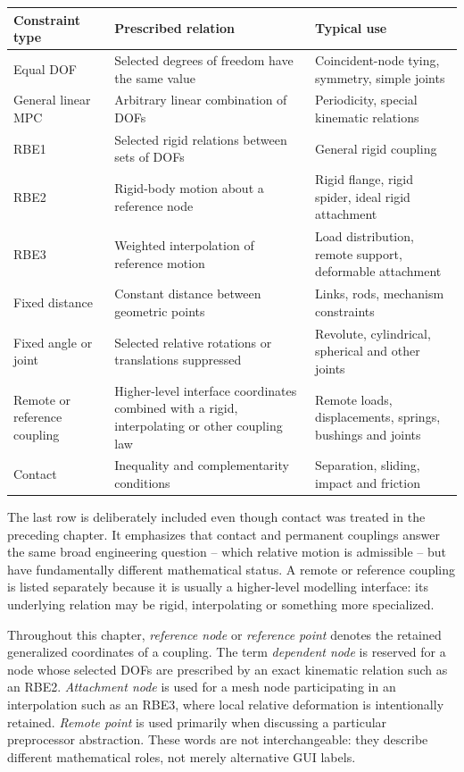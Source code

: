 \begin{center}
\begin{tabular}{|p{}|p{}|p{}|}
\hline
\textbf{Constraint type} & \textbf{Prescribed relation} & \textbf{Typical use} \\
\hline
Equal DOF & Selected degrees of freedom have the same value & Coincident-node tying, symmetry, simple joints \\
\hline
General linear MPC & Arbitrary linear combination of DOFs & Periodicity, special kinematic relations \\
\hline
RBE1 & Selected rigid relations between sets of DOFs & General rigid coupling \\
\hline
RBE2 & Rigid-body motion about a reference node & Rigid flange, rigid spider, ideal rigid attachment \\
\hline
RBE3 & Weighted interpolation of reference motion & Load distribution, remote support, deformable attachment \\
\hline
Fixed distance & Constant distance between geometric points & Links, rods, mechanism constraints \\
\hline
Fixed angle or joint & Selected relative rotations or translations suppressed & Revolute, cylindrical, spherical and other joints \\
\hline
Remote or reference coupling & Higher-level interface coordinates combined with a rigid, interpolating or other coupling law & Remote loads, displacements, springs, bushings and joints \\
\hline
Contact & Inequality and complementarity conditions & Separation, sliding, impact and friction \\
\hline
\end{tabular}
\end{center}

The last row is deliberately included even though contact was treated in the
preceding chapter. It emphasizes that contact and permanent couplings answer the
same broad engineering question -- which relative motion is admissible -- but
have fundamentally different mathematical status. A remote or reference coupling
is listed separately because it is usually a higher-level modelling interface:
its underlying relation may be rigid, interpolating or something more specialized.

Throughout this chapter, \textit{reference node} or \textit{reference point}
denotes the retained generalized coordinates of a coupling. The term
\textit{dependent node} is reserved for a node whose selected DOFs are prescribed
by an exact kinematic relation such as an RBE2. \textit{Attachment node} is used
for a mesh node participating in an interpolation such as an RBE3, where local
relative deformation is intentionally retained. \textit{Remote point} is used
primarily when discussing a particular preprocessor abstraction. These words are
not interchangeable: they describe different mathematical roles, not merely
alternative GUI labels.

